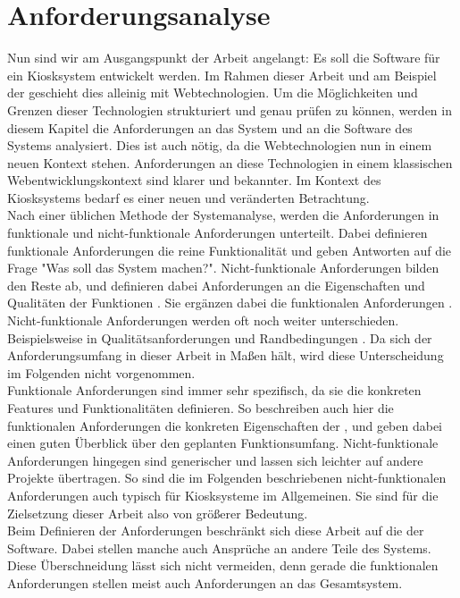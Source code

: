 \chapter{Anforderungsanalyse}
\label{chap:anforderungen}

Nun sind wir am Ausgangspunkt der Arbeit angelangt: Es soll die Software für ein Kiosksystem
entwickelt werden. Im Rahmen dieser Arbeit und am Beispiel der \shst{}
geschieht dies alleinig mit Webtechnologien. Um die Möglichkeiten und Grenzen dieser Technologien
strukturiert und genau prüfen zu können, werden in diesem Kapitel die Anforderungen an das System
und an die Software des Systems analysiert.
Dies ist auch nötig, da die Webtechnologien nun in einem neuen Kontext stehen. Anforderungen an diese
Technologien in einem klassischen Webentwicklungskontext sind klarer und bekannter. Im Kontext
des Kiosksystems bedarf es einer neuen und veränderten Betrachtung.\\

Nach einer üblichen Methode der Systemanalyse, werden die Anforderungen in funktionale und 
nicht-funktionale Anforderungen unterteilt. Dabei definieren funktionale Anforderungen die 
reine Funktionalität und geben Antworten 
auf die Frage "Was soll das System machen?". Nicht-funktionale Anforderungen bilden den Reste ab,
und definieren dabei Anforderungen an die Eigenschaften und Qualitäten der
Funktionen \cite{systemanalyse}. Sie ergänzen dabei die funktionalen 
Anforderungen \cite{systematisches}. Nicht-funktionale Anforderungen werden oft noch weiter unterschieden.
Beispielsweise in Qualitätsanforderungen und Randbedingungen \cite{systemanalyse,systematisches}.
Da sich der Anforderungsumfang in dieser Arbeit in Maßen hält, wird diese Unterscheidung im Folgenden
nicht vorgenommen.\\
Funktionale Anforderungen sind immer sehr spezifisch, da sie die konkreten Features
und Funktionalitäten definieren. So beschreiben auch hier die funktionalen Anforderungen die konkreten
Eigenschaften der \shst{}, und geben dabei einen guten Überblick über den geplanten Funktionsumfang.
Nicht-funktionale Anforderungen hingegen sind generischer und lassen sich leichter auf andere Projekte
übertragen. So sind die im Folgenden beschriebenen nicht-funktionalen Anforderungen auch typisch
für Kiosksysteme im Allgemeinen. Sie sind für die Zielsetzung dieser Arbeit also von 
größerer Bedeutung.\\
Beim Definieren der Anforderungen beschränkt sich diese Arbeit auf die der Software.
Dabei stellen manche auch Ansprüche an andere Teile des Systems. Diese Überschneidung
lässt sich nicht vermeiden, denn gerade die funktionalen Anforderungen stellen meist auch Anforderungen an das 
Gesamtsystem.\\ 


